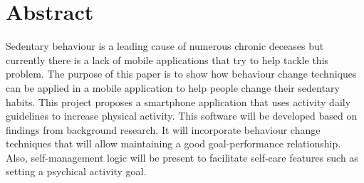 \chapter{Abstract}
Sedentary behaviour is a leading cause of numerous chronic deceases but currently there is a lack of mobile applications that try to help tackle this problem. The purpose of this paper is to show how behaviour change techniques can be applied in a mobile application to help people change their sedentary habits. This project proposes a smartphone application that uses activity daily guidelines to increase physical activity. This software will be developed based on findings from background research. It will incorporate behaviour change techniques that will allow maintaining a good goal-performance relationship. Also, self-management logic will be present to facilitate self-care features such as setting a psychical activity goal.